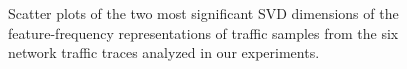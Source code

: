 \documentclass{acm_proc_article-sp}
\begin{document}
\begin{figure}[t]
\vspace{-0.9em}
\begin{center}
\caption{Scatter plots of the two most significant SVD dimensions of the feature-frequency representations of traffic samples from the six network traffic traces analyzed in our experiments.} 
\end{center}
\vspace{-2em}
\end{figure}

\end{document}
